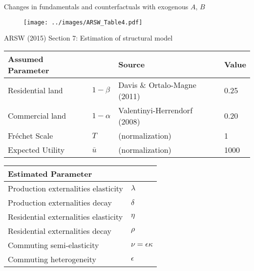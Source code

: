 \documentclass[11pt,notes=hide,aspectratio=169]{beamer}
\begin{document}
\begin{frame}{Changes in fundamentals and counterfactuals with exogenous $A$, $B$}
\begin{figure}
\centering
\texttt{[image: ../images/ARSW\_Table4.pdf]}
\end{figure}
\end{frame}
\begin{frame}{ARSW (2015) Section 7: Estimation of structural model}
\begin{center}{\small
\begin{tabular}{llll} \toprule
Assumed Parameter & & Source & Value \\ \midrule
Residential land & $ 1-\beta $ & Davis \& Ortalo-Magne (2011) & 0.25 \\
Commercial land & $1-\alpha$ & Valentinyi-Herrendorf (2008) & 0.20 \\
Fr\'{e}chet Scale & $T$ & (normalization) & 1 \\
Expected Utility & $\bar{u}$ & (normalization) & 1000 \\ \bottomrule
\end{tabular}
\begin{tabular}{ll} \toprule
Estimated Parameter \\ \midrule
Production externalities elasticity & $\lambda$ \\
Production externalities decay & $\delta$ \\
Residential externalities elasticity & $\eta$ \\
Residential externalities decay & $\rho$ \\
Commuting semi-elasticity & $\nu=\epsilon \kappa$ \\
Commuting heterogeneity & $\epsilon$ \\ \bottomrule
\end{tabular}
}\end{center}
\end{frame}
\end{document}
